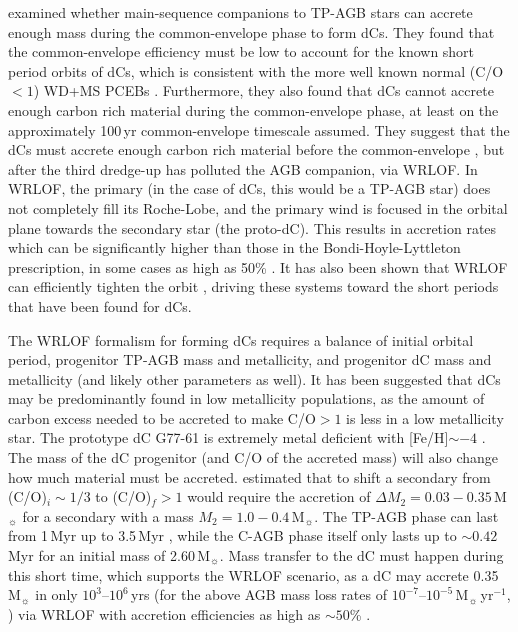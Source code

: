 \documentclass[twocolumn, tighten, times, astrosymb]{aastex631}
\begin{document}
\citet{Roulston2021a} examined whether main-sequence companions to TP-AGB stars can accrete enough mass during the common-envelope phase to form dCs. They found that the common-envelope efficiency must be low to account for the known short period orbits of dCs, which is consistent with the more well known normal (C/O $< 1$) WD+MS PCEBs \citep{Zorotovic2010, Toonen2013, Camacho2014}. Furthermore, they also found that dCs cannot accrete enough carbon rich material during the common-envelope phase, at least on the approximately 100\,yr common-envelope timescale assumed. They suggest that the dCs must accrete enough carbon rich material before the common-envelope , but after the third dredge-up has polluted the AGB companion, via WRLOF\citep{Mohamed2007}. In WRLOF, the primary (in the case of dCs, this would be a TP-AGB star) does not completely fill its Roche-Lobe, and the primary wind is focused in the orbital plane towards the secondary star (the proto-dC). This results in accretion rates which can be significantly higher than those in the Bondi-Hoyle-Lyttleton prescription, in some cases as high as 50\% \citep{Abate2013, Saladino2018, Saladino2019a, Saladino2019b}. It has also been shown that WRLOF can efficiently tighten the orbit \citep{Saladino2018, Chen2018}, driving these systems toward the short periods that have been found for dCs.

The WRLOF formalism for forming dCs requires a balance of initial orbital period, progenitor TP-AGB mass and metallicity, and progenitor dC mass and metallicity (and likely other parameters as well). 
It has been suggested that dCs may be predominantly found in low metallicity populations, as the amount of carbon excess needed to be accreted to make C/O$>1$ is less in a low metallicity star.  The prototype dC G77-61 is extremely metal deficient with [Fe/H]$\sim -4$ \citep{Plez2005}. The mass of the dC progenitor (and C/O of the accreted mass) will also change how much material must be accreted. \citet{Miszalski2013} estimated that to shift a secondary from (C/O)$_i \sim 1/3$ to (C/O)$_f > 1$ would require the accretion of $\Delta M_2 = 0.03-0.35$\,M$_\sun$ for a secondary with a mass $M_2 = 1.0-0.4$\,M$_\sun$. 
The TP-AGB phase can last from 1\,Myr up to 3.5\,Myr \citep{Kalirai2014}, while the C-AGB phase itself only lasts up to $\sim 0.42$\,Myr for an initial mass of 2.60\,M$_\sun$. Mass transfer to the dC must happen during this short time, which supports the WRLOF scenario, as a dC may accrete 0.35\,M$_\sun$ in only $10^3$--$10^6$\,yrs (for the above AGB mass loss rates of $10^{-7}$--$10^{-5}$\,M$_\sun$\,yr$^{-1}$,  \citealt{Hofner2018}) via WRLOF with accretion efficiencies as high as $\sim 50$\% \citep{Abate2013}. 
\end{document}
